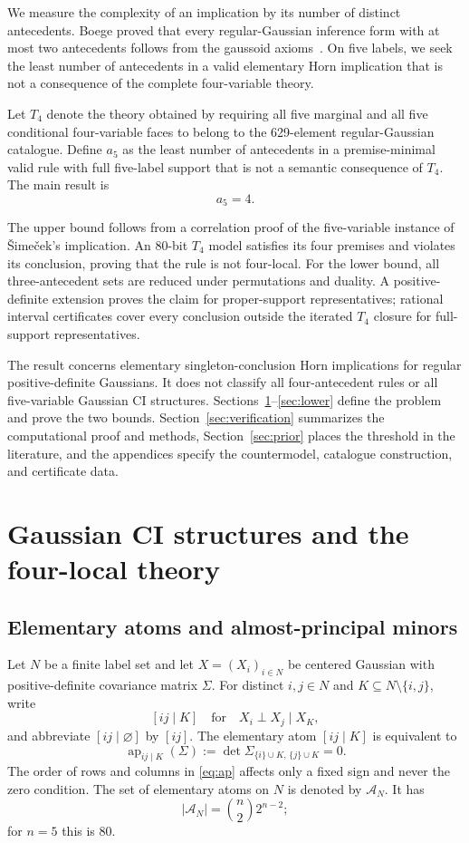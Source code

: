 \documentclass[10pt]{article}
\theoremstyle{definition}
\newcommand{\A}{\mathcal A}
\newcommand{\Tfour}{T_4}
\newcommand{\AP}{\operatorname{ap}}
\begin{document}
We measure the complexity of an implication by its number of distinct antecedents.  Boege proved that every regular-Gaussian inference form with at most two antecedents follows from the gaussoid axioms~\cite{Boege2022,BoegeCorrection2022}.  On five labels, we seek the least number of antecedents in a valid elementary Horn implication that is not a consequence of the complete four-variable theory.

Let $\Tfour$ denote the theory obtained by requiring all five marginal and all five conditional four-variable faces to belong to the 629-element regular-Gaussian catalogue.  Define $a_5$ as the least number of antecedents in a premise-minimal valid rule with full five-label support that is not a semantic consequence of $\Tfour$.  The main result is
\[
 \boxed{a_5=4}.
\]

The upper bound follows from a correlation proof of the five-variable instance of \v{S}ime\v{c}ek's implication.  An 80-bit $\Tfour$ model satisfies its four premises and violates its conclusion, proving that the rule is not four-local.  For the lower bound, all three-antecedent sets are reduced under permutations and duality.  A positive-definite extension proves the claim for proper-support representatives; rational interval certificates cover every conclusion outside the iterated $\Tfour$ closure for full-support representatives.

The result concerns elementary singleton-conclusion Horn implications for regular positive-definite Gaussians.  It does not classify all four-antecedent rules or all five-variable Gaussian CI structures.  Sections~\ref{sec:setup}--\ref{sec:lower} define the problem and prove the two bounds.  Section~\ref{sec:verification} summarizes the computational proof and methods, Section~\ref{sec:prior} places the threshold in the literature, and the appendices specify the countermodel, catalogue construction, and certificate data.

\section{Gaussian CI structures and the four-local theory}\label{sec:setup}

\subsection{Elementary atoms and almost-principal minors}

Let $N$ be a finite label set and let $X=(X_i)_{i\in N}$ be centered Gaussian with positive-definite covariance matrix $\Sigma$.  For distinct $i,j\in N$ and $K\subseteq N\setminus\{i,j\}$, write
\[
 [ij\mid K]\quad\text{for}\quad X_i\perp X_j\mid X_K,
\]
and abbreviate $[ij\mid\varnothing]$ by $[ij]$.  The elementary atom $[ij\mid K]$ is equivalent to
\begin{equation}\label{eq:ap}
 \AP_{ij\mid K}(\Sigma)
 :=\det \Sigma_{\{i\}\cup K,\,\{j\}\cup K}=0.
\end{equation}
The order of rows and columns in \eqref{eq:ap} affects only a fixed sign and never the zero condition.  The set of elementary atoms on $N$ is denoted by $\A_N$.  It has
\[
 |\A_N|=\binom{n}{2}2^{n-2};
\]
for $n=5$ this is $80$.
\end{document}
